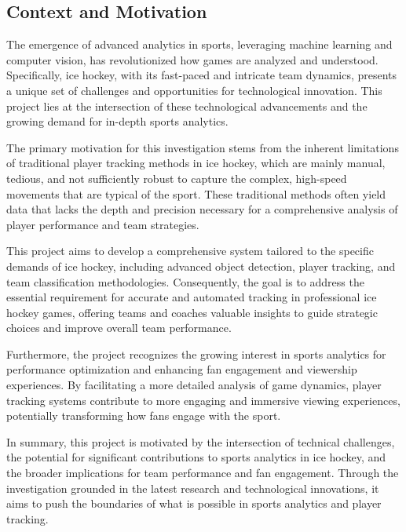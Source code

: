 \documentclass[12pt, letterpaper]{article}
\begin{document}
{
\setlength{\parskip}{0.3cm}
\subsection{Context and Motivation}
\begin{spacing}{1.3}
The emergence of advanced analytics in sports, leveraging machine learning and computer vision, has revolutionized how games are analyzed and understood. Specifically, ice hockey, with its fast-paced and intricate team dynamics, presents a unique set of challenges and opportunities for technological innovation. This project lies at the intersection of these technological advancements and the growing demand for in-depth sports analytics.

The primary motivation for this investigation stems from the inherent limitations of traditional player tracking methods in ice hockey, which are mainly manual, tedious, and not sufficiently robust to capture the complex, high-speed movements that are typical of the sport. These traditional methods often yield data that lacks the depth and precision necessary for a comprehensive analysis of player performance and team strategies.


This project aims to develop a comprehensive system tailored to the specific demands of ice hockey, including advanced object detection, player tracking, and team classification methodologies. Consequently, the goal is to address the essential requirement for accurate and automated tracking in professional ice hockey games, offering teams and coaches valuable insights to guide strategic choices and improve overall team performance.

Furthermore, the project recognizes the growing interest in sports analytics for performance optimization and enhancing fan engagement and viewership experiences. By facilitating a more detailed analysis of game dynamics, player tracking systems contribute to more engaging and immersive viewing experiences, potentially transforming how fans engage with the sport.

In summary, this project is motivated by the intersection of technical challenges, the potential for significant contributions to sports analytics in ice hockey, and the broader implications for team performance and fan engagement. Through the investigation grounded in the latest research and technological innovations, it aims to push the boundaries of what is possible in sports analytics and player tracking.
\end{spacing}
}
\end{document}
